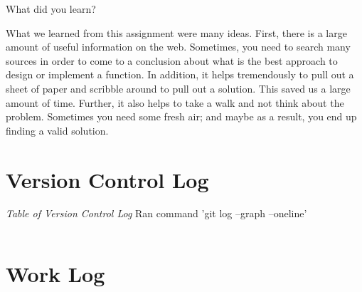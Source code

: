 \documentclass{article}
\newenvironment{question}[2][Question]{\begin{trivlist}
\item[\hskip \labelsep {\bfseries #1}\hskip \labelsep {\bfseries #2.}]}{\end{trivlist}}
\begin{document}

\vspace{0.25in}
\begin{question}{4}
What did you learn?
\end{question}
What we learned from this assignment were many ideas. First, there is a large amount of useful information on the web. Sometimes, you need to search many sources in order to come to a conclusion about what is the best approach to design or implement a function. In addition, it helps tremendously to pull out a sheet of paper and scribble around to pull out a solution. This saved us a large amount of time. Further, it also helps to take a walk and not think about the problem. Sometimes you need some fresh air; and maybe as a result, you end up finding a valid solution. 

\section*{Version Control Log}
\textit{Table of Version Control Log} Ran command 'git log --graph --oneline'
\newline
\begin{center}
\begin{tabular}{ c c }

\end{tabular}
\end{center}

\section*{Work Log}


\end{document}
